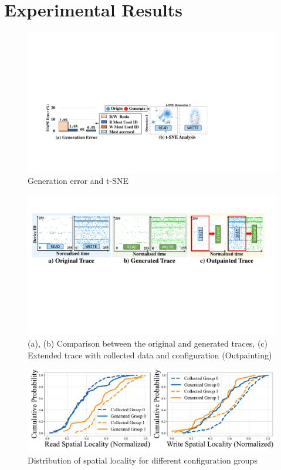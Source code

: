 \documentclass[
  manuscript=article,  %
  layout=preprint,  %
  year=20xx,
  volume=x,
]{extra/joas}
\begin{document}
\section{Experimental Results}

\begin{figure}
    \centering
    \includegraphics[width=0.9\columnwidth]{figure/eval.pdf}
    \caption{Generation error and t-SNE}
    \label{fig:eval}
\end{figure}


\begin{figure}
    \centering
    \includegraphics[width=0.9\columnwidth]{figure/result.pdf}
    \caption{(a), (b) Comparison between the original and generated traces, (c) Extended trace with collected data and configuration (Outpainting)}
    \label{fig:img}
\end{figure}

\begin{figure}
    \centering
    \includegraphics[width=0.9\columnwidth]{figure/locality.pdf}
    \caption{Distribution of spatial locality for different configuration groups}
    \label{fig:distribution}
\end{figure}
\end{document}
